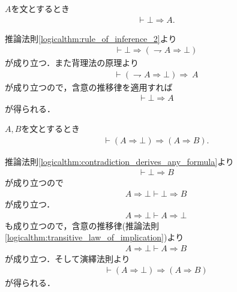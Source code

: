 	\begin{screen}
		\begin{logicalthm}[矛盾からはあらゆる式が導かれる]\label{logicalthm:contradiction_derives_any_formula}
			$A$を文とするとき
			\begin{align}
				\vdash \bot \Longrightarrow A.
			\end{align}
		\end{logicalthm}
	\end{screen}
	
	\begin{prf}
		推論法則\ref{logicalthm:rule_of_inference_2}より
		\begin{align}
			\vdash \bot \Longrightarrow (\rightharpoondown A \Longrightarrow \bot)
		\end{align}
		が成り立つ．また背理法の原理より
		\begin{align}
			\vdash (\rightharpoondown A \Longrightarrow \bot) \Longrightarrow\ A
		\end{align}
		が成り立つので，含意の推移律を適用すれば
		\begin{align}
			\vdash \bot \Longrightarrow A
		\end{align}
		が得られる．
		\QED
	\end{prf}
	
	\begin{screen}
		\begin{logicalthm}[矛盾を導く式はあらゆる式を導く]\label{logicalthm:formula_leading_to_contradiction_derives_any_formula}
			$A,B$を文とするとき
			\begin{align}
				\vdash (A \Longrightarrow \bot) \Longrightarrow (A \Longrightarrow B).
			\end{align}
		\end{logicalthm}
	\end{screen}
	
	\begin{prf}
		推論法則\ref{logicalthm:contradiction_derives_any_formula}より
		\begin{align}
			\vdash \bot \Longrightarrow B
		\end{align}
		が成り立つので
		\begin{align}
			A \Longrightarrow \bot \vdash \bot \Longrightarrow B
		\end{align}
		が成り立つ．
		\begin{align}
			A \Longrightarrow \bot \vdash A \Longrightarrow \bot
		\end{align}
		も成り立つので，含意の推移律(推論法則\ref{logicalthm:transitive_law_of_implication})より
		\begin{align}
			A \Longrightarrow \bot \vdash A \Longrightarrow B
		\end{align}
		が成り立つ．そして演繹法則より
		\begin{align}
			\vdash (A \Longrightarrow \bot) \Longrightarrow (A \Longrightarrow B)
		\end{align}
		が得られる．
		\QED
	\end{prf}
	
